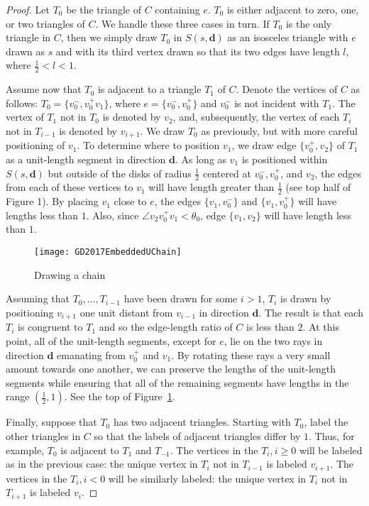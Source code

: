 \documentclass[orivec]{llncs}
\begin{document}
\begin{proof}
Let $T_0$ be the triangle of $C$ containing $e$. $T_0$ is either adjacent to zero, one, or two triangles of $C$. We handle these three cases in turn. If $T_0$ is the only triangle in $C$, then
we simply draw $T_0$ in $S(s,\mathbf{d})$ as an isosceles triangle with $e$ drawn as $s$ and with its third vertex drawn so that its two edges have length $l$, where $\frac{1}{2} < l < 1$.

Assume now that $T_0$ is adjacent to a triangle $T_1$ of $C$. Denote the vertices of $C$ as follows: $T_0 = \{v_0^-,v_0^+ v_1\}$, where $e = \{v_0^-, v_0^+\}$ and $v_0^-$ is not incident with $T_1$. The vertex of $T_1$ not in $T_0$ is denoted by $v_2$, and, subsequently, the vertex of each $T_i$ not in $T_{i-1}$ is denoted by $v_{i+1}$. We draw $T_0$ as previously, but with more careful positioning of $v_1$. To determine where to position $v_1$, we draw edge $\{v_0^+, v_2\}$ of
$T_1$ as a unit-length segment in direction $\mathbf{d}$. As long as $v_1$ is positioned within
$S(s,\mathbf{d})$ but outside of the disks of radius $\frac{1}{2}$ centered at $v_0^-, v_0^+$, and $v_2$, the edges from each of these vertices to $v_1$ will have length greater than $\frac{1}{2}$
(see top half of Figure 1).
By placing $v_1$ close to $e$, the edges  $\{ v_1, v_0^- \}$ and  $\{ v_1, v_0^+ \}$ will have lengths less than $1$.
Also, since $\angle v_2 v_0^+ v_1 < \theta_0$, edge $\{ v_1, v_2 \}$ will have length less than $1$.

\begin{figure}
\centering
\texttt{[image: GD2017EmbeddedUChain]}
\caption{\label{fi:EmbeddedUChain}Drawing a chain}
\end{figure}

Assuming that $T_0, \ldots, T_{i-1}$ have been drawn for some $i > 1$, $T_i$ is drawn by positioning $v_{i+1}$  one unit distant  from $v_{i-1}$ in direction $\mathbf{d}$. The result is that
each $T_i$ is congruent to $T_1$ and so the edge-length ratio of $C$ is less than $2$.
At this point, all of the unit-length segments, except for $e$, lie on the two rays in direction
$\mathbf{d}$ emanating from $v_0^+$ and $v_1$. By rotating these rays a very small amount towards one another, we can preserve the lengths of the unit-length segments while ensuring that
all of the remaining segments have lengths in the range $(\frac{1}{2}, 1)$.
See the top of Figure~\ref{fi:EmbeddedUChain}.

Finally, suppose that $T_0$ has two adjacent triangles. Starting with $T_0$, label the other triangles in $C$ so that the labels of adjacent triangles differ by $1$. Thus, for example, $T_0$ is adjacent to $T_1$ and $T_{-1}$. The vertices in the $T_i, i \geq 0$ will be labeled as in the previous case: the unique vertex in $T_i $ not in $T_{i-1}$ is labeled $v_{i+1}$.
The vertices in the $T_i, i < 0$ will be similarly labeled: the unique vertex in $T_i $ not in $T_{i+1}$ is labeled $v_i$.


\end{proof}
\end{document}
